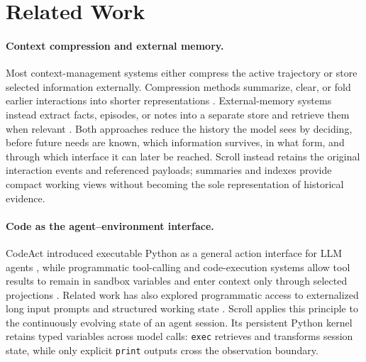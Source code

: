 
\section{Related Work}
\label{sec:related}

\paragraph{Context compression and external memory.}
Most context-management systems either compress the active trajectory or store selected information externally. Compression methods summarize, clear, or fold earlier interactions into shorter representations \citep{kang2025acon,ye2025agentfold,zhou2026mem1,kontonis2026memento}.
External-memory systems instead extract facts, episodes, or notes into a separate store and retrieve them when relevant \citep{packer2023memgpt,tan2026lightmem,letta2026contextrepos}. 
Both approaches reduce the history the model sees by deciding, before future needs are known, which information survives, in what form, and through which interface it can later be reached.
Scroll instead retains the original interaction events and referenced payloads; summaries and indexes provide compact working views without becoming the sole representation of historical evidence.

\paragraph{Code as the agent–environment interface.}
CodeAct introduced executable Python as a general action interface for LLM agents \citep{codeact}, while programmatic tool-calling and code-execution systems allow tool results to remain in sandbox variables and enter context only through selected projections \citep{ptc,anthropic2025codeexec}. Related work has also explored programmatic access to externalized long input prompts \citep{zhang2025rlm} and structured working state \citep{li2026userascode,vista2026}. Scroll applies this principle to the continuously evolving state of an agent session. Its persistent Python kernel retains typed variables across model calls: \texttt{exec} retrieves and transforms session state, while only explicit \texttt{print} outputs cross the observation boundary.

